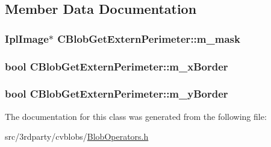 \subsection{Member Data Documentation}
\hypertarget{classCBlobGetExternPerimeter_afa64b04d0a3cd605dcfb9117361d7252}{
\subsubsection[{m\-\_\-mask}]{\setlength{\rightskip}{0pt plus 5cm}Ipl\-Image$\ast$ C\-Blob\-Get\-Extern\-Perimeter\-::m\-\_\-mask\hspace{0.3cm}{\ttfamily [private]}}}\label{classCBlobGetExternPerimeter_afa64b04d0a3cd605dcfb9117361d7252}
\hypertarget{classCBlobGetExternPerimeter_a9f735fab175aaf26a169bf404df5202c}{
\subsubsection[{m\-\_\-x\-Border}]{\setlength{\rightskip}{0pt plus 5cm}bool C\-Blob\-Get\-Extern\-Perimeter\-::m\-\_\-x\-Border\hspace{0.3cm}{\ttfamily [private]}}}\label{classCBlobGetExternPerimeter_a9f735fab175aaf26a169bf404df5202c}
\hypertarget{classCBlobGetExternPerimeter_ad33c70e8fa890433930151b39bf77d49}{
\subsubsection[{m\-\_\-y\-Border}]{\setlength{\rightskip}{0pt plus 5cm}bool C\-Blob\-Get\-Extern\-Perimeter\-::m\-\_\-y\-Border\hspace{0.3cm}{\ttfamily [private]}}}\label{classCBlobGetExternPerimeter_ad33c70e8fa890433930151b39bf77d49}


The documentation for this class was generated from the following file\-:\begin{DoxyCompactItemize}
\item 
src/3rdparty/cvblobs/\hyperlink{BlobOperators_8h}{Blob\-Operators.\-h}\end{DoxyCompactItemize}
